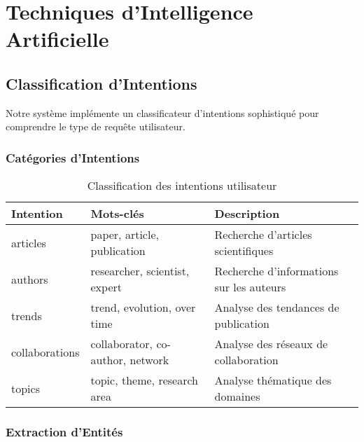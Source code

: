 \documentclass[12pt,a4paper]{article}
\begin{document}
\section{Techniques d'Intelligence Artificielle}

\subsection{Classification d'Intentions}

Notre système implémente un classificateur d'intentions sophistiqué pour comprendre le type de requête utilisateur.

\subsubsection{Catégories d'Intentions}

\begin{table}[H]
\centering
\begin{tabular}{|l|l|p{8cm}|}
\hline
\textbf{Intention} & \textbf{Mots-clés} & \textbf{Description} \\
\hline
articles & paper, article, publication & Recherche d'articles scientifiques \\
\hline
authors & researcher, scientist, expert & Recherche d'informations sur les auteurs \\
\hline
trends & trend, evolution, over time & Analyse des tendances de publication \\
\hline
collaborations & collaborator, co-author, network & Analyse des réseaux de collaboration \\
\hline
topics & topic, theme, research area & Analyse thématique des domaines \\
\hline
\end{tabular}
\caption{Classification des intentions utilisateur}
\label{tab:intent_classification}
\end{table}

\subsubsection{Extraction d'Entités}
\end{document}
